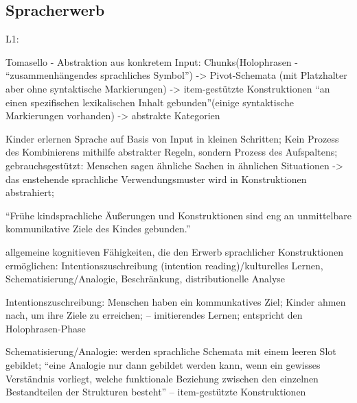 


\subsection{Spracherwerb}
    L1:

    Tomasello - Abstraktion aus konkretem Input: Chunks(Holophrasen - ``zusammenhängendes sprachliches Symbol'') -> Pivot-Schemata (mit Platzhalter aber ohne syntaktische Markierungen) -> item-gestützte Konstruktionen ``an einen spezifischen lexikalischen Inhalt gebunden''(einige syntaktische Markierungen vorhanden) -> abstrakte Kategorien

        \cite{Tomasello06} Kinder erlernen Sprache auf Basis von Input in kleinen Schritten;
        Kein Prozess des Kombinierens mithilfe abstrakter Regeln, sondern Prozess des Aufspaltens;
        gebrauchsgestützt: Menschen sagen ähnliche Sachen in ähnlichen Situationen -> das enstehende sprachliche Verwendungsmuster wird in Konstruktionen abstrahiert;

        ``Frühe kindsprachliche Äußerungen und Konstruktionen sind eng an unmittelbare kommunikative Ziele des Kindes gebunden.''

        allgemeine kognitieven Fähigkeiten, die den Erwerb sprachlicher Konstruktionen ermöglichen: Intentionszuschreibung (intention reading)/kulturelles Lernen, Schematisierung/Analogie, Beschränkung, distributionelle Analyse

        Intentionszuschreibung: Menschen haben ein kommunkatives Ziel; Kinder ahmen nach, um ihre Ziele zu erreichen; -- imitierendes Lernen; entspricht den Holophrasen-Phase

        Schematisierung/Analogie: werden sprachliche Schemata mit einem leeren Slot gebildet;
        ``eine Analogie nur dann gebildet werden kann, wenn ein gewisses Verständnis vorliegt, welche funktionale Beziehung zwischen den einzelnen Bestandteilen der Strukturen besteht''
        -- item-gestützte Konstruktionen


